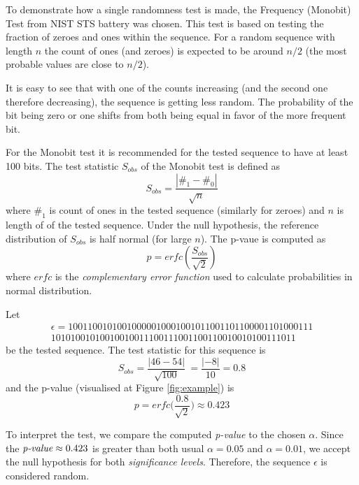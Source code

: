 \documentclass[
  digital,     %
  oneside,     %
  nosansbold,  %
  nocolorbold, %
  nolof,         %
  nolot,         %
]{fithesis4}
\begin{document}
To demonstrate how a single randomness test is made, the Frequency (Monobit) Test from NIST STS battery was chosen. \cite[p. 2-2]{nist_special} This test is based on testing the fraction of zeroes and ones within the sequence. For a random sequence with length $n$ the  count of ones (and zeroes) is expected to be around $n/2$ (the most probable values are close to $n/2$). 

It is easy to see that with one of the counts increasing (and the second one therefore decreasing), the sequence is getting less random. The probability of the bit being zero or one shifts from both being equal in favor of the more frequent bit.

For the Monobit test it is recommended for the tested sequence to have at least 100 bits. The test statistic $S_{obs}$ of the Monobit test is defined as \[S_{obs} = \dfrac{|\#_1 - \#_0|}{\sqrt{n}}\] where $\#_1$ is count of ones in the tested sequence (similarly for zeroes) and $n$ is length of of the tested sequence. Under the null hypothesis, the reference distribution of $S_{obs}$ is half normal (for large $n$). The p-vaue is computed as \[ p = erfc(\dfrac{S_{obs}}{\sqrt{2}}) \] where $erfc$ is the \emph{complementary error function} used to calculate probabilities in normal distribution.

 Let
\[\begin{split}
    \epsilon = 10011001010010000010001001011001101100001101000111\\10101001010010010011100111001100110010010100111011
\end{split}\]
 be the tested sequence. The test statistic for this sequence is 
 \[S_{obs} = \dfrac{|46 - 54|}{\sqrt{100}}\ = \dfrac{|-8|}{10} = 0.8\]
 and the p-value (visualised at Figure \ref{fig:example}) is 
 \[p = erfc\biggl(\dfrac{0.8}{\sqrt{2}}\biggr) \approx 0.423\]

To interpret the test, we compare the computed \emph{p-value} to the chosen $\alpha$. Since the $\emph{p-value} \approx 0.423$ is greater than both usual $\alpha = 0.05$ and $\alpha = 0.01$, we accept the null hypothesis for both \emph{significance levels}. Therefore, the sequence $\epsilon$ is considered random.
\end{document}
